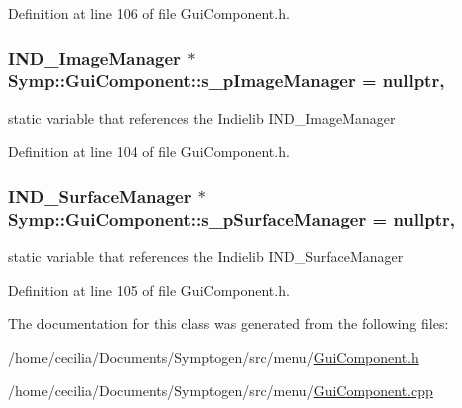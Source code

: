 Definition at line 106 of file Gui\-Component.\-h.

\hypertarget{class_symp_1_1_gui_component_a7e1826a68cccf9b7a922e5f4176dba97}{
\subsubsection[{s\-\_\-p\-Image\-Manager}]{\setlength{\rightskip}{0pt plus 5cm}I\-N\-D\-\_\-\-Image\-Manager $\ast$ Symp\-::\-Gui\-Component\-::s\-\_\-p\-Image\-Manager = nullptr\hspace{0.3cm}{\ttfamily [static]}, {\ttfamily [protected]}}}\label{class_symp_1_1_gui_component_a7e1826a68cccf9b7a922e5f4176dba97}
static variable that references the Indielib I\-N\-D\-\_\-\-Image\-Manager 

Definition at line 104 of file Gui\-Component.\-h.

\hypertarget{class_symp_1_1_gui_component_a768d28ae7ffce1d8a8025e6204f82ee5}{
\subsubsection[{s\-\_\-p\-Surface\-Manager}]{\setlength{\rightskip}{0pt plus 5cm}I\-N\-D\-\_\-\-Surface\-Manager $\ast$ Symp\-::\-Gui\-Component\-::s\-\_\-p\-Surface\-Manager = nullptr\hspace{0.3cm}{\ttfamily [static]}, {\ttfamily [protected]}}}\label{class_symp_1_1_gui_component_a768d28ae7ffce1d8a8025e6204f82ee5}
static variable that references the Indielib I\-N\-D\-\_\-\-Surface\-Manager 

Definition at line 105 of file Gui\-Component.\-h.



The documentation for this class was generated from the following files\-:\begin{DoxyCompactItemize}
\item 
/home/cecilia/\-Documents/\-Symptogen/src/menu/\hyperlink{_gui_component_8h}{Gui\-Component.\-h}\item 
/home/cecilia/\-Documents/\-Symptogen/src/menu/\hyperlink{_gui_component_8cpp}{Gui\-Component.\-cpp}\end{DoxyCompactItemize}
